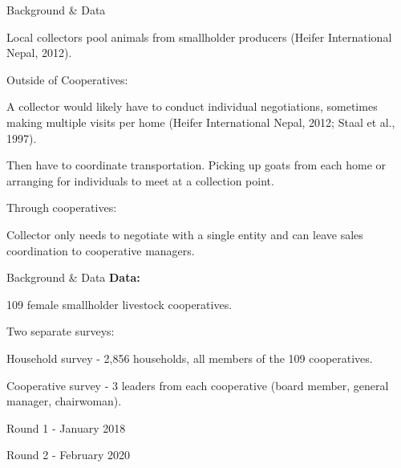 \documentclass[aspectratio=169]{beamer}
\newenvironment{wideitemize}{\itemize\addtolength{\itemsep}{10pt}}{\enditemize}
\begin{document}
\begin{frame}{Background \& Data}
    \begin{wideitemize}
        \item Local collectors pool animals from smallholder producers (Heifer International Nepal, 2012). 
        \item Outside of Cooperatives: \vspace{.25cm}
            \begin{wideitemize}
                \item A collector would likely have to conduct individual negotiations, sometimes making multiple visits per home (Heifer International Nepal, 2012; Staal et al., 1997).
                \item Then have to coordinate transportation. Picking up goats from each home or arranging for individuals to meet at a collection point. 
            \end{wideitemize}
        \item Through cooperatives: \vspace{.25cm}
            \begin{wideitemize}
                \item Collector only needs to negotiate with a single entity and can leave sales coordination to cooperative managers.
            \end{wideitemize}
    \end{wideitemize}
\end{frame}

\begin{frame}{Background \& Data}
\textbf{Data:} \vspace{.5cm}
    \begin{wideitemize}
        \item 109 female smallholder livestock cooperatives. 
        \item Two separate surveys: \vspace{.25cm}
            \begin{wideitemize}
                \item Household survey - 2,856 households, all members of the 109 cooperatives.
                \item Cooperative survey - 3 leaders from each cooperative (board member, general manager, chairwoman). 
            \end{wideitemize}
        \item Round 1 - January 2018 
        \item Round 2 - February 2020
    \end{wideitemize}
\end{frame}
\end{document}
